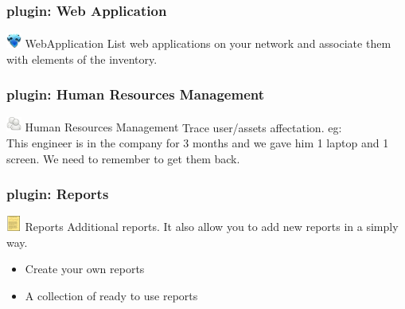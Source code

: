 \documentclass{beamer}
\begin{document}
\begin{frame}
    \frametitle{plugin: Web Application}

    \begin{block}{\includegraphics[height=0.5cm]{./pics/plugins/webapp.jpg} WebApplication}
        List web applications on your network and associate them with elements of the inventory.
    \end{block}

\end{frame}



\begin{frame}
    \frametitle{plugin: Human Resources Management}

    \begin{block}{\includegraphics[height=0.5cm]{./pics/plugins/human.jpg} Human Resources Management}
        Trace user/assets affectation. eg: \\
        \small{This engineer is in the company for 3 months and we gave him 1 laptop and 1 screen. We need to remember to get them back.}
    \end{block}

\end{frame}


\begin{frame}
    \frametitle{plugin: Reports}

    \begin{block}{\includegraphics[height=0.5cm]{./pics/plugins/reports.jpg} Reports}
        Additional reports. It also allow you to add new reports in a simply way.
        \begin{itemize}
            \item Create your own reports
            \item A collection of ready to use reports
        \end{itemize}
    \end{block}

\end{frame}
\end{document}
